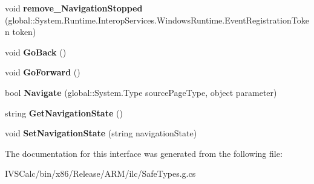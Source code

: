\begin{DoxyCompactItemize}
\item 
\mbox{\label{interface_windows_1_1_u_i_1_1_xaml_1_1_controls_1_1_i_frame_adb7fdd2a3d4caa3565de5270aeb78262}} 
void {\bfseries remove\+\_\+\+Navigation\+Stopped} (global\+::\+System.\+Runtime.\+Interop\+Services.\+Windows\+Runtime.\+Event\+Registration\+Token token)
\item 
\mbox{\label{interface_windows_1_1_u_i_1_1_xaml_1_1_controls_1_1_i_frame_a030d64c39f359cacb399064bd14c6360}} 
void {\bfseries Go\+Back} ()
\item 
\mbox{\label{interface_windows_1_1_u_i_1_1_xaml_1_1_controls_1_1_i_frame_aa80a1d8a508afe0e94ed4d473c8bab8f}} 
void {\bfseries Go\+Forward} ()
\item 
\mbox{\label{interface_windows_1_1_u_i_1_1_xaml_1_1_controls_1_1_i_frame_a26a5d60621812443d6a0837e7c36c53e}} 
bool {\bfseries Navigate} (global\+::\+System.\+Type source\+Page\+Type, object parameter)
\item 
\mbox{\label{interface_windows_1_1_u_i_1_1_xaml_1_1_controls_1_1_i_frame_a5fae043ba619aec40326928f7c8f0708}} 
string {\bfseries Get\+Navigation\+State} ()
\item 
\mbox{\label{interface_windows_1_1_u_i_1_1_xaml_1_1_controls_1_1_i_frame_abca9cc6c6c9ab20f0837c2d3734275f1}} 
void {\bfseries Set\+Navigation\+State} (string navigation\+State)
\end{DoxyCompactItemize}


The documentation for this interface was generated from the following file\+:\begin{DoxyCompactItemize}
\item 
I\+V\+S\+Calc/bin/x86/\+Release/\+A\+R\+M/ilc/Safe\+Types.\+g.\+cs\end{DoxyCompactItemize}

